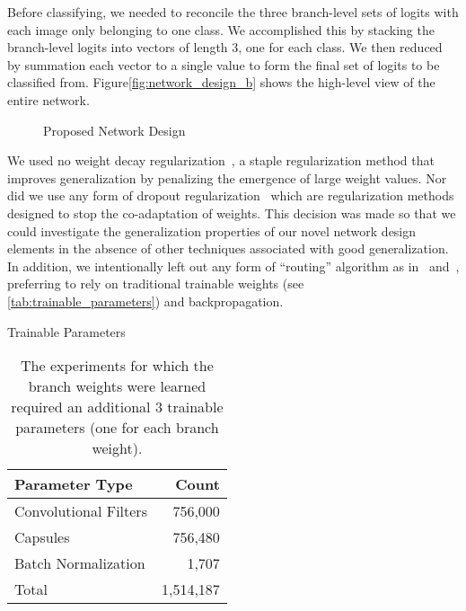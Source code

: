 \documentclass{article}
\begin{document}
Before classifying, we needed to reconcile the three branch-level sets of logits with each image only belonging to one class.  We accomplished this by stacking the branch-level logits into vectors of length 3, one for each class.  We then reduced by summation each vector to a single value to form the final set of logits to be classified from.  Figure\autoref{fig:network_design_b} shows the high-level view of the entire network.

\begin{figure}[!htbp]
  \centering
  \hfill
  \hfill
  \hfill{} \caption{Proposed Network Design}\label{fig:network_design}
\end{figure}

We used no weight decay regularization~\cite{Hinton1987}, a staple regularization method that improves generalization by penalizing the emergence of large weight values.  Nor did we use any form of dropout regularization~\cite{Hinton2012}\cite{Wan2013} which are regularization methods designed to stop the co-adaptation of weights.  This decision was made so that we could investigate the generalization properties of our novel network design elements in the absence of other techniques associated with good generalization.  In addition, we intentionally left out any form of ``routing'' algorithm as in~\cite{Sabour2017} and~\cite{Hinton2018}, preferring to rely on traditional trainable weights (see \autoref{tab:trainable_parameters}) and backpropagation.

\begin{table}[!htbp]
  \caption{Trainable Parameters}
  \centering
  \begin{tabularx}{.6\textwidth}{@{}Xr@{}}
    \toprule
      Parameter Type & Count \\
    \midrule
      Convolutional Filters & 756,000 \\
      Capsules & 756,480 \\
      Batch Normalization & 1,707 \\
    \midrule
      Total & 1,514,187 \\
    \bottomrule
  \end{tabularx}\\
  \captionsetup{width=.57\textwidth}
  \caption*{The experiments for which the branch weights were learned required an additional 3 trainable parameters (one for each branch weight).}\label{tab:trainable_parameters}
\end{table}
\end{document}
